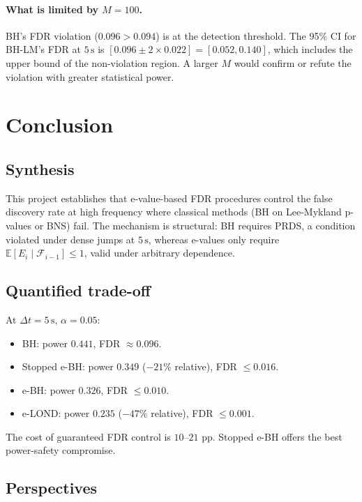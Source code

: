 \documentclass[11pt,a4paper,twocolumn]{article}
\theoremstyle{plain}
\theoremstyle{definition}
\theoremstyle{remark}
\newcommand{\E}{\mathbb{E}}
\begin{document}
\paragraph{What is limited by $M = 100$.}
BH's FDR violation ($0.096 > 0.094$) is at the detection threshold. The
95\% CI for BH-LM's FDR at $5\,\mathrm{s}$ is
$[0.096 \pm 2 \times 0.022] = [0.052, 0.140]$, which includes the upper
bound of the non-violation region. A larger $M$ would confirm or refute the
violation with greater statistical power.

\section{Conclusion}
\label{sec:conclusion}

\subsection{Synthesis}

This project establishes that e-value-based FDR procedures control the
false discovery rate at high frequency where classical methods (BH on
Lee-Mykland p-values or BNS) fail. The mechanism is structural: BH
requires PRDS, a condition violated under dense jumps at $5\,\mathrm{s}$,
whereas e-values only require $\E[E_i \mid \mathcal{F}_{i-1}] \le 1$,
valid under arbitrary dependence.

\subsection{Quantified trade-off}

At $\Delta t = 5\,\mathrm{s}$, $\alpha = 0.05$:
\begin{itemize}
  \item BH: power $0.441$, FDR $\approx 0.096$.
  \item Stopped e-BH: power $0.349$ ($-21\%$ relative), FDR $\le 0.016$.
  \item e-BH: power $0.326$, FDR $\le 0.010$.
  \item e-LOND: power $0.235$ ($-47\%$ relative), FDR $\le 0.001$.
\end{itemize}
The cost of guaranteed FDR control is $10$--$21$ pp. Stopped e-BH offers
the best power-safety compromise.

\subsection{Perspectives}
\end{document}
